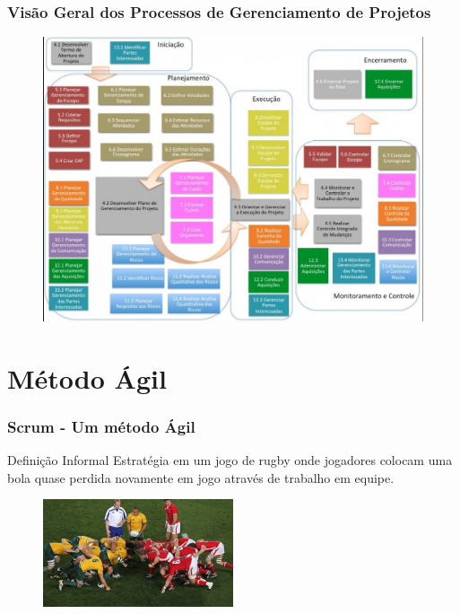 \begin{frame}
 \frametitle{Visão Geral dos Processos de Gerenciamento de Projetos}
 \begin{figure}
  \centering
  \includegraphics[width = \textwidth]{figs/figura-4-1024x765.jpg}
 \end{figure}
\end{frame}
\section{Método Ágil}
\begin{frame}
 \frametitle{Scrum - Um método Ágil}
 \begin{block}{Definição Informal}
Estratégia em um jogo de rugby onde
jogadores colocam uma bola quase perdida
novamente em jogo através de trabalho em
equipe.
 \end{block}
 \begin{figure}
  \centering
  \includegraphics[width = 0.5\textwidth]{figs/326341-wallabies-scrum.jpg}
 \end{figure}
\end{frame}

